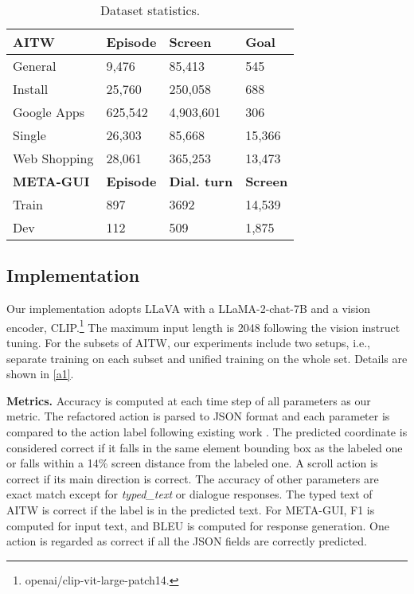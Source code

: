 \begin{table}[htb]
	\centering\small
	{\begin{tabular}{p{1.9cm}p{1.3cm}p{1.5cm}p{1.0cm}}
		\toprule
		\textbf{AITW} & \textbf{Episode} &\textbf{Screen} & \textbf{Goal} \\
            \midrule
            General &9,476 &85,413 &545 \\
            Install &25,760 &250,058 &688\\
            Google Apps  &625,542 &4,903,601 &306\\
            Single &26,303 &85,668 &15,366\\
            Web Shopping  &28,061 &365,253 &13,473\\
            \midrule
		\textbf{META-GUI} & \textbf{Episode} &\textbf{Dial. turn} & \textbf{Screen} \\
            \midrule
            Train  &897 & 3692 & 14,539\\
            Dev &112 & 509 & 1,875\\
		\bottomrule
	\end{tabular}
	}
        \caption{Dataset statistics.}
	\label{datastat}
\end{table}

\subsection{Implementation}
Our implementation adopts LLaVA \cite{liu2023llava} with a LLaMA-2-chat-7B and a vision encoder, CLIP.\footnote{openai/clip-vit-large-patch14.\label{clip}} The maximum input length is 2048 following the vision instruct tuning. 
For the subsets of AITW, our experiments include two setups, i.e., separate training on each subset and unified training on the whole set. Details are shown in \ref{a1}.

\noindent \textbf{Metrics.} 
Accuracy is computed at each time step of all parameters as our metric.
The refactored action is parsed to JSON format and each parameter is compared to the action label following existing work \cite{rawles2023android}.
The predicted coordinate is considered correct if it falls in the same element bounding box as the labeled one or falls within a 14\% screen distance from the labeled one.
A scroll action is correct if its main direction is correct.
The accuracy of other parameters are exact match except for \textit{typed\_text} or dialogue responses.
The typed text of AITW is correct if the label is in the predicted text.
For META-GUI, F1 is computed for input text, and BLEU is computed for response generation.
One action is regarded as correct if all the JSON fields are correctly predicted.

